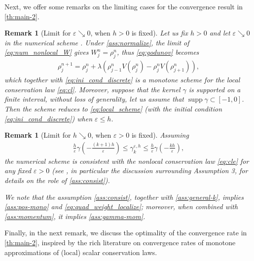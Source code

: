 \documentclass[10pt]{amsart}
\theoremstyle{plain}
\newtheorem{remark}[lemma]{Remark}
\theoremstyle{definition}
\numberwithin{equation}{section}
\newcommand{\eps}{{\varepsilon}}
\begin{document}
Next, we offer some remarks on the limiting cases for the convergence result in \cref{th:main-2}.

\begin{remark}[Limit for $\varepsilon \searrow 0$, when $h>0$ is fixed]\label{rk:hfixed}
Let us fix $h>0$ and let $\varepsilon\searrow0$ in the numerical scheme . Under \cref{ass:normalize}, the limit of \cref{eq:num_nonlocal_W} gives $W_j^n=\rho_j^n$, thus \cref{eq:godunov} becomes
\begin{align}\label{eq:local_scheme}
    \rho_j^{n+1} = \rho_j^n + \lambda (\rho_{j-1}^n V(\rho_j^n) - \rho_j^n V(\rho_{j+1}^n)),
\end{align}
which together with \cref{eq:ini_cond_discrete} is a monotone scheme for the local conservation law \cref{eq:cl}.
Moreover, suppose that the kernel $\gamma$ is supported on a finite interval, without loss of generality, let us assume that $\operatorname{supp}\gamma\subset[-1,0]$. Then the scheme  reduces to \cref{eq:local_scheme} (with the initial condition \cref{eq:ini_cond_discrete}) when $\eps\le h$.  
\end{remark}


\begin{remark}[Limit for $h \searrow 0$, when $\varepsilon>0$ is fixed]\label{rk:epsfixed}
Assuming
    \begin{align}
    \frac{h}{\varepsilon}\gamma\left(-\frac{(k+1)h}\varepsilon\right)\le\gamma_k^{\eps,h}\le \frac{h}{\varepsilon}\gamma\left(-\frac{kh}\varepsilon\right) \label{ass:consist},
\end{align}
the numerical scheme  is consistent with the nonlocal conservation law \cref{eq:cle} for any fixed $\varepsilon >0$  (see \cite[Section 1]{MR4742183}, in particular the discussion surrounding Assumption 3, for details on the role of \cref{ass:consist}). 

We note that the assumption \cref{ass:consist}, together with \cref{ass:general-k}, implies \cref{ass:pos-mono} and \cref{eq:quad_weight_localize}; moreover, when combined with \cref{ass:momentum}, it implies \cref{ass:gamma-mom}.
\end{remark}

Finally, in the next remark, we discuss the optimality of the convergence rate in \cref{th:main-2}, inspired by the rich literature on convergence rates of monotone approximations of (local) scalar conservation laws.
\end{document}
